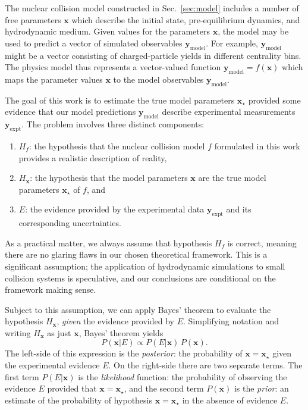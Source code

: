 \documentclass[aps,prc,reprint,amsmath,nofootinbib]{revtex4-1}
\newcommand{\xv}{\mathbf x}
\newcommand{\ym}{{\mathbf y}_\text{model}}
\newcommand{\ye}{{\mathbf y}_\text{expt}}
\begin{document}
The nuclear collision model constructed in Sec.~\ref{sec:model} includes a number of free parameters $\xv$ which describe the initial state, pre-equilibrium dynamics, and hydrodynamic medium.
Given values for the parameters $\xv$, the model may be used to predict a vector of simulated observables $\ym$.
For example, $\ym$ might be a vector consisting of charged-particle yields in different centrality bins.
The physics model thus represents a vector-valued function $\ym = f(\xv)$ which maps the parameter values $\xv$ to the model observables $\ym$.

The goal of this work is to estimate the true model parameters $\xv_\star$ provided some evidence that our model predictions $\ym$ describe experimental measurements $\ye$.
The problem involves three distinct components:
\begin{enumerate}[itemsep=0pt, leftmargin=2\parindent]
  \item $H_f$: the hypothesis that the nuclear collision model $f$ formulated in this work provides a realistic description of reality,
  \item $H_\xv$: the hypothesis that the model parameters $\xv$ are the true model parameters $\xv_\star$ of $f$, and
  \item $E$: the evidence provided by the experimental data $\ye$ and its corresponding uncertainties.
\end{enumerate}
As a practical matter, we always assume that hypothesis $H_f$ is correct, meaning there are no glaring flaws in our chosen theoretical framework.
This is a significant assumption; the application of hydrodynamic simulations to small collision systems is speculative, and our conclusions are conditional on the framework making sense.

Subject to this assumption, we can apply Bayes' theorem to evaluate the hypothesis $H_\xv$, \emph{given} the evidence provided by $E$.
Simplifying notation and writing $H_\xv$ as just $\xv$, Bayes' theorem yields
\begin{equation}
  \label{eq:bayes}
  P(\xv | E) \propto P(E | \xv)\, P(\xv).
\end{equation}
The left-side of this expression is the \emph{posterior}: the probability of $\xv = \xv_\star$ given the experimental evidence $E$.
On the right-side there are two separate terms.
The first term $P(E | \xv)$ is the \emph{likelihood} function: the probability of observing the evidence $E$ provided that $\xv = \xv_\star$, and the second term $P(\xv)$ is the \emph{prior}: an estimate of the probability of hypothesis $\xv = \xv_\star$ in the absence of evidence $E$.
\end{document}
